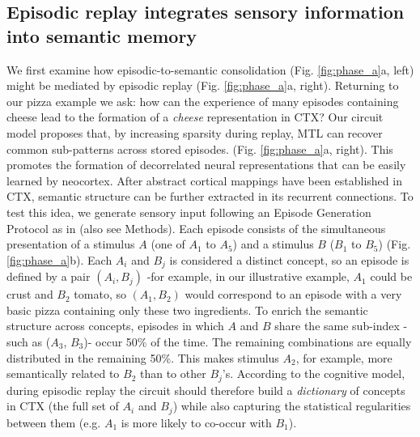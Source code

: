 \documentclass{article}
\begin{document}
\subsection*{Episodic replay integrates sensory information into semantic memory}
We first examine how episodic-to-semantic consolidation (Fig. \ref{fig:phase_a}a, left) might be mediated by episodic replay (Fig. \ref{fig:phase_a}a, right). Returning to our pizza example we ask: how can the experience of many episodes containing cheese lead to the formation of a \textit{cheese} representation in CTX? Our circuit model proposes that, by increasing sparsity during replay, MTL can recover common sub-patterns across stored episodes. (Fig. \ref{fig:phase_a}a, right). This promotes the formation of decorrelated neural representations that can be easily learned by neocortex. After abstract cortical mappings have been established in CTX, semantic structure can be further extracted in its recurrent connections.
\newline\newline
To test this idea, we generate sensory input following an Episode Generation Protocol as in  (also see Methods). Each episode consists of the simultaneous presentation of a stimulus $A$ (one of $A_1$ to $A_5$) and a stimulus $B$ ($B_1$ to $B_5$) (Fig. \ref{fig:phase_a}b). Each $A_i$ and  $B_j$ is considered a distinct concept, so an episode is defined by a pair $(A_i, B_j)$ -for example, in our illustrative example, $A_1$ could be crust and $B_2$ tomato, so $(A_1, B_2)$ would correspond to an episode with a very basic pizza containing only these two ingredients.  To enrich the semantic structure across concepts, episodes in which $A$ and $B$ share the same sub-index -such as ($A_3$, $B_3$)-  occur 50\% of the time. The remaining combinations are equally distributed in the remaining 50\%. This makes stimulus $A_2$, for example, more semantically related to $B_2$ than to other $B_j$'s. According to the cognitive model, during episodic replay the circuit should therefore build a \textit{dictionary} of concepts in CTX (the full set of $A_i$ and $B_j$) while also capturing the statistical regularities between them (e.g. $A_1$ is more likely to co-occur with $B_1$).
\newline\newline
\end{document}

